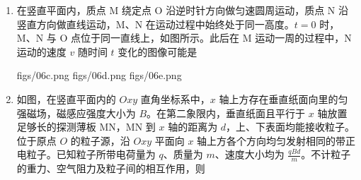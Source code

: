 \documentclass[\gkver]{gaokaozhenti}
\begin{document}
\begin{enumerate}
\onepicture[w=5.00cm]{}

{地面对木箱的支持力逐渐增大}
{甲运动的加速度大小为 $2.5 \Umsq$}
{乙受到绳子的拉力大小为 $5.0 \UN$}


\item
在竖直平面内，质点 M 绕定点 O 沿逆时针方向做匀速圆周运动，质点 N 沿竖直方向做直线运动，M、N 在运动过程中始终处于同一高度。$t = 0$ 时，M、N 与 O 点位于同一直线上，如图所示。此后在 M 运动一周的过程中，N 运动的速度 $v$ 随时间 $t$ 变化的图像可能是

\onepicture[w=3.60cm]{}

{figs/06c.png}
{figs/06d.png}
{figs/06e.png}


\item
如图，在竖直平面内的 $Oxy$ 直角坐标系中，$x$ 轴上方存在垂直纸面向里的匀强磁场，磁感应强度大小为 $B$。在第二象限内，垂直纸面且平行于 $x$ 轴放置足够长的探测薄板 MN，MN 到 $x$ 轴的距离为 $d$，上、下表面均能接收粒子。位于原点 $O$ 的粒子源，沿 $Oxy$ 平面向 $x$ 轴上方各个方向均匀发射相同的带正电粒子。已知粒子所带电荷量为 $q$、质量为 $m$、速度大小均为 $\frac{qBd}{m}$。不计粒子的重力、空气阻力及粒子间的相互作用，则


\end{enumerate}
\end{document}
